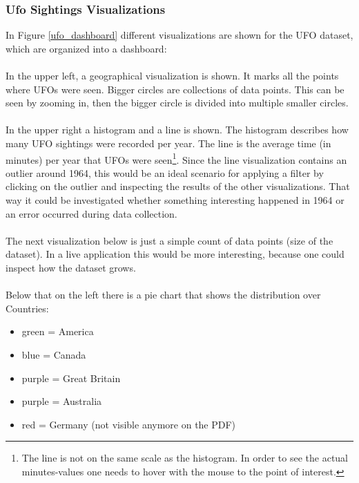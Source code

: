 \documentclass[bibliography=totoc]{article}
\begin{document}
\subsubsection{Ufo Sightings Visualizations}
In Figure \ref{ufo_dashboard} different visualizations are shown for the UFO dataset,
which are organized into a dashboard:
\\
\\
In the upper left, a geographical visualization is shown. It marks all the points
where UFOs were seen. Bigger circles are collections of data points. This can be seen
by zooming in, then the bigger circle is divided into multiple smaller circles.
\\
\\
In the upper right a histogram and a line is shown. The histogram describes
how many UFO sightings were recorded per year. The line is the average time 
(in minutes) per year that UFOs were seen\footnote{The line is not on the same scale as the histogram.
In order to see the actual minutes-values one needs to hover with the mouse to the point of interest.}.
Since the line visualization contains an outlier around 1964, this would
be an ideal scenario for applying a filter by clicking on the outlier and inspecting the results of the other
visualizations. That way
it could be investigated whether something interesting happened in 1964 or
an error occurred during data collection.
\\
\\
The next visualization below is just a simple count of data points (size of the dataset). 
In a live application this would be more interesting, because one could inspect how the 
dataset grows.
\\
\\
Below that on the left there is a pie chart that shows the distribution over Countries:
\begin{itemize}
  \item green = America
  \item blue = Canada
  \item purple = Great Britain
  \item purple = Australia
  \item red = Germany (not visible anymore on the PDF)
\end{itemize}
\end{document}

